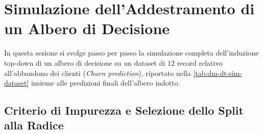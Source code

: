 \FloatBarrier
\section{Simulazione dell'Addestramento di un Albero di Decisione}
\label{sec:dm-dt-training-sim}

In questa sezione si svolge passo per passo la simulazione completa dell'induzione top-down di un albero di decisione su un dataset di $12$ record relativo all'abbandono dei clienti (\textit{Churn prediction}), riportato nella \autoref{tab:dm-dt-sim-dataset} insieme alle predizioni finali dell'albero indotto.

\begin{table}[H]
\centering
\caption{Dataset di addestramento (\textit{Churn prediction}, $N = 12$) e predizioni finali dell'albero.}
\label{tab:dm-dt-sim-dataset}
\small
{}
\end{table}

\FloatBarrier
\subsection{Criterio di Impurezza e Selezione dello Split alla Radice}
\label{subsec:dm-dt-sim-root}


